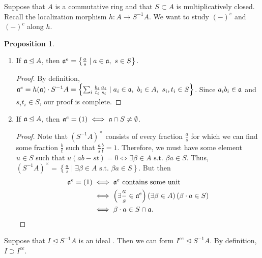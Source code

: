 \documentclass[10pt,letterpaper,cm]{nupset}
\theoremstyle{definition}
\theoremstyle{theorem}
\newtheorem{prop}[definition]{Proposition}
\theoremstyle{remark}
\newcommand{\1}{\mathbf{1}}
\newcommand{\0}{\vec 0}
\begin{document}
Suppose that $A$ is a commutative ring and that $S\subset A$ is multiplicatively closed. Recall the localization morphism $h: A \to S^{-1}A$. We want to study $(-)^e$ and $(-)^c$ along $h$. 

\begin{prop} $ $
\begin{enumerate}
\item If $\frak{a} \unlhd A$, then $\frak{a}^e = \left\{\frac{a}{s} \mid a\in \frak{a}, \ s \in S\right\}$.
\begin{proof}
By definition, $\frak{a}^e = h(\frak{a}) \cdot S^{-1}A = \left\{ \sum_{i} \frac{b_i}{t_i}\frac{a_i}{s_i} \mid a_i \in \frak{a}, \ b_i \in A, \ s_i, t_i \in S\right\}$. Since $a_ib_i \in \frak{a}$ and $s_it_i \in S$, our proof is complete.
\end{proof}
\item If $\frak{a} \unlhd A$, then $\frak{a}^e = (1) \iff \frak{a} \cap S \ne \emptyset$. 
\begin{proof}
Note that $(S^{-1}A)^{\times}$ consists of every fraction $\frac{a}{s}$ for which we can find some fraction $\frac{b}{t}$ such that $\frac{a}{s}\frac{b}{t} =1$. Therefore, we must have some element $u\in S$ such that $u(ab-st) = 0 \iff \exists \beta \in A \text{ s.t. } \beta a \in S$. Thus, $(S^{-1}A)^{\times} = \left\{\frac{a}{s} \mid \exists \beta \in A \text{ s.t. } \beta a \in S\right\}$. But then 
\begin{align*}
\frak{a}^e = (1) & \iff \frak{a}^e  \text{ contains some unit }
\\ &  \iff \left(\exists \frac{a}{s} \in \frak{a}^e\right)\left(\exists \beta \in A\right)\left(\beta \cdot a \in S\right)
\\ &  \iff \beta \cdot a \in S\cap \frak{a}.
\end{align*}
\end{proof}
\end{enumerate}
\end{prop}

\medskip


Suppose that $I \unlhd S^{-1}A$ is an ideal . Then we can form $I^{ce} \unlhd S^{-1}A$. By definition, $I \supset I^{ce}$.
\end{document}
